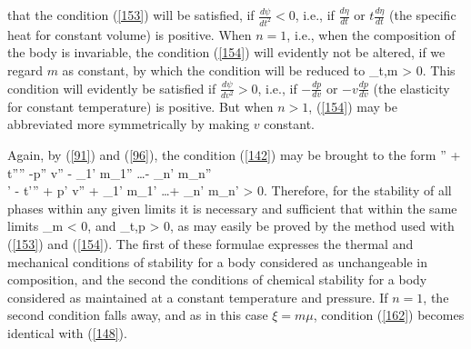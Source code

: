\documentclass[12pt]{article}
\begin{document}
that the condition (\ref{153}) will be satisfied, if  $\frac{d \psi}{d t^2}<0$, i.e., if $\frac{d\eta}{dt}$ or $t \frac{d\eta}{dt}$ (the specific heat for constant volume) is positive. When $n=1$, i.e., when the composition of the body is invariable, the condition (\ref{154}) will evidently not be altered, if we regard $m$ as constant, by which the condition will be reduced to
\eqs{}_{t,m} > 0.  \label{160}\eqe
This condition will evidently be satisfied if $\frac{d \psi}{d v^2}>0$, i.e., if $-\frac{dp}{dv}$ or $-v\frac{dp}{dv}$ (the elasticity for constant temperature) is positive. But when $n > 1$, (\ref{154}) may be abbreviated more symmetrically by making $v$ constant.


Again, by (\ref{91}) and (\ref{96}), the condition (\ref{142}) may be brought to the form
\eqs 
\xi'' + t''\eta'' -p'' v'' - \mu_1' m_1'' \dots - \mu_n' m_n''\\
\xi' - t'\eta'' + p' v'' + \mu_1' m_1' \dots + \mu_n' m_n' > 0. \label{161}\eqe
Therefore, for the stability of all phases within any given limits it is necessary and sufficient that within the same limits
\eqs
{}_m < 0,  \label{162}\eqe
and     
\eqs  {}_{t,p}  > 0, \label{163}\eqe
as may easily be proved by the method used with (\ref{153}) and (\ref{154}). The first of these formulae expresses the thermal and mechanical conditions of stability for a body considered as unchangeable in composition, and the second the conditions of chemical stability for a body considered as maintained at a constant temperature and pressure. If $n = 1$, the second condition falls away, and as in this case $\xi= m \mu$, condition (\ref{162}) becomes identical with (\ref{148}).
\end{document}
